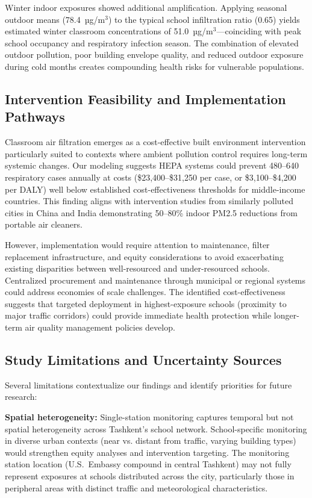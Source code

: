 \documentclass[11pt,a4paper]{article}
\begin{document}
Winter indoor exposures showed additional amplification. Applying seasonal outdoor means (78.4~µg/m$^3$) to the typical school infiltration ratio (0.65) yields estimated winter classroom concentrations of 51.0~µg/m$^3$---coinciding with peak school occupancy and respiratory infection season. The combination of elevated outdoor pollution, poor building envelope quality, and reduced outdoor exposure during cold months creates compounding health risks for vulnerable populations.

\subsection{Intervention Feasibility and Implementation Pathways}

Classroom air filtration emerges as a cost-effective built environment intervention particularly suited to contexts where ambient pollution control requires long-term systemic changes. Our modeling suggests HEPA systems could prevent 480--640 respiratory cases annually at costs (\$23,400--\$31,250 per case, or \$3,100--\$4,200 per DALY) well below established cost-effectiveness thresholds for middle-income countries. This finding aligns with intervention studies from similarly polluted cities in China and India demonstrating 50--80\% indoor PM2.5 reductions from portable air cleaners.

However, implementation would require attention to maintenance, filter replacement infrastructure, and equity considerations to avoid exacerbating existing disparities between well-resourced and under-resourced schools. Centralized procurement and maintenance through municipal or regional systems could address economies of scale challenges. The identified cost-effectiveness suggests that targeted deployment in highest-exposure schools (proximity to major traffic corridors) could provide immediate health protection while longer-term air quality management policies develop.

\subsection{Study Limitations and Uncertainty Sources}

Several limitations contextualize our findings and identify priorities for future research:

\textbf{Spatial heterogeneity:} Single-station monitoring captures temporal but not spatial heterogeneity across Tashkent's school network. School-specific monitoring in diverse urban contexts (near vs. distant from traffic, varying building types) would strengthen equity analyses and intervention targeting. The monitoring station location (U.S.\ Embassy compound in central Tashkent) may not fully represent exposures at schools distributed across the city, particularly those in peripheral areas with distinct traffic and meteorological characteristics.
\end{document}
